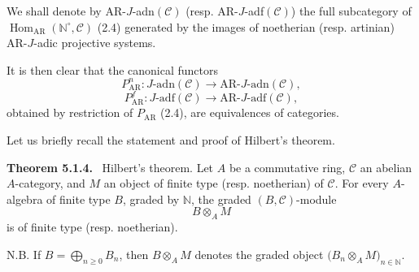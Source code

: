 \documentclass[11pt]{article}
\newenvironment{statement}[1]{\par\medskip\noindent\textbf{#1.}\ }{\par\medskip}
\DeclareMathOperator{\Hom}{Hom}
\providecommand{\Hom}{\operatorname{Hom}}
\providecommand{\Hom}{\operatorname{Hom}}
\begin{document}
We shall denote by AR-\(J\)-adn\((\mathcal C)\) (resp. AR-\(J\)-adf\((\mathcal C)\)) the full subcategory of \(\Hom_{\mathrm{AR}}(\mathbb N^\circ,\mathcal C)\) (2.4) generated by the images of noetherian (resp. artinian) AR-\(J\)-adic projective systems.

It is then clear that the canonical functors
\[
P^n_{\mathrm{AR}}:J\text{-adn}(\mathcal C)\longrightarrow \mathrm{AR}\text{-}J\text{-adn}(\mathcal C),
\]
\[
P^f_{\mathrm{AR}}:J\text{-adf}(\mathcal C)\longrightarrow \mathrm{AR}\text{-}J\text{-adf}(\mathcal C),
\]
obtained by restriction of \(P_{\mathrm{AR}}\) (2.4), are equivalences of categories.

Let us briefly recall the statement and proof of Hilbert's theorem.

\begin{statement}{Theorem 5.1.4}
Hilbert's theorem. Let \(A\) be a commutative ring, \(\mathcal C\) an abelian \(A\)-category, and \(M\) an object of finite type (resp. noetherian) of \(\mathcal C\). For every \(A\)-algebra of finite type \(B\), graded by \(\mathbb N\), the graded \((B,\mathcal C)\)-module
\[
B\otimes_A M
\]
is of finite type (resp. noetherian).

N.B. If \(B=\bigoplus_{n\ge0}B_n\), then \(B\otimes_A M\) denotes the graded object \(\bigl(B_n\otimes_A M\bigr)_{n\in\mathbb N}\).
\end{statement}
\end{document}
